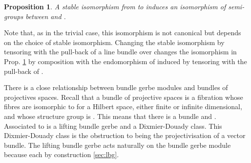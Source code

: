 \documentclass[a4paper,reqno]{amsart}
\DeclareMathOperator{\Mod}{Mod}
\theoremstyle{plain}
\newtheorem{proposition}[theorem]{Proposition}
\theoremstyle{definition}
\theoremstyle{remark}
\numberwithin{equation}{section}
\numberwithin{figure}{section}
\providecommand{\cP}{{\mathcal P}}
\providecommand{\<}{\langle}
\renewcommand{\>}{\rangle}
\begin{document}
\begin{proposition}
\label{prop:module}
A stable isomorphism from \coordHE{} to
\coordHE{} induces an isomorphism of semi-groups
between \myHighlight{$\Mod(L)$}\coordHE{} and \myHighlight{$\Mod(J)$}\coordHE{}.
\end{proposition}

Note that, as in the trivial case, this isomorphism is not
canonical but depends on the choice of stable isomorphism. Changing the
stable isomorphism by tensoring with the pull-back of a line bundle
\coordHE{} over \coordHE{}
changes the isomorphism in Prop.  \ref{prop:module}
by composition with the endomorphism
of \myHighlight{$\Mod(J)$}\coordHE{} induced by tensoring with the pull-back of \coordHE{}.

There is a close relationship between bundle
gerbe modules and bundles of projectives spaces. Recall that a
bundle of projective spaces \myHighlight{$\cP \to M$}\coordHE{} is a fibration whose fibres
are isomorphic
to \coordHE{} for \coordHE{} a Hilbert space, either finite or infinite dimensional,
and whose structure group is \coordHE{}. This  means that there is a
\coordHE{} bundle \coordHE{} and \myHighlight{$\cP = X \times_{PU(V)} P(V)$}\coordHE{}.
Associated to \coordHE{} is a
lifting bundle gerbe \coordHE{} and a Dixmier-Douady class.
This Dixmier-Douady class is the obstruction to \myHighlight{$\cP$}\coordHE{} being the
projectivisation of a vector bundle.  The lifting bundle gerbe acts naturally
on the bundle gerbe module \coordHE{} because each \coordHE{} by
construction \ref{sec:lbg}.
\end{document}
